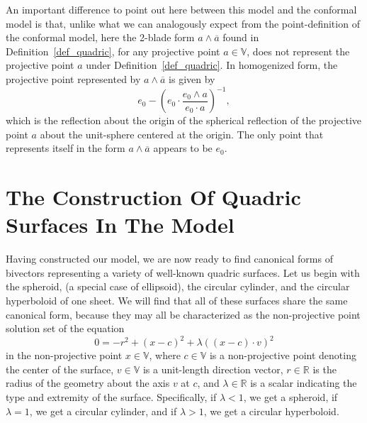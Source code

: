 \documentclass{ecgd-l}
\newcommand{\V}{\mathbb{V}}
\newcommand{\R}{\mathbb{R}}
\theoremstyle{definition}
\theoremstyle{remark}
\numberwithin{equation}{section}
\begin{document}
An important difference to point out here between this model and the conformal model is that,
unlike what we can analogously expect from the point-definition of the conformal model,
here the 2-blade form $a\wedge\overline{a}$ found in Definition~\ref{def_quadric}, for
any projective point $a\in\V$, does not represent the projective point $a$ under Definition~\ref{def_quadric}.
In homogenized form, the projective point represented by $a\wedge\overline{a}$ is given by
\begin{equation}
e_0 - \left(e_0\cdot\frac{e_0\wedge a}{e_0\cdot a}\right)^{-1},
\end{equation}
which is the reflection about the origin of the spherical reflection of the projective point $a$
about the unit-sphere centered at the origin.  The only point that represents itself
in the form $a\wedge\overline{a}$ appears to be $e_0$.

\section{The Construction Of Quadric Surfaces In The Model}

Having constructed our model, we are now ready to find canonical forms of bivectors
representing a variety of well-known quadric surfaces.  Let us begin with the
spheroid, (a special case of ellipsoid), the circular cylinder, and the circular hyperboloid
of one sheet.  We will find that all of these surfaces share the same canonical form,
because they may all be characterized as the non-projective point solution set of the equation
\begin{equation}\label{equ_spheroid}
0 = -r^2 + (x-c)^2 + \lambda((x-c)\cdot v)^2
\end{equation}
in the non-projective point $x\in\V$, where $c\in\V$ is a non-projective
point denoting the center of the surface, $v\in\V$ is a unit-length direction
vector, $r\in\R$ is the radius of the geometry about the axis $v$ at $c$, and
$\lambda\in\R$ is a scalar indicating the type and extremity of the surface.
Specifically, if $\lambda<1$, we get a spheroid, if $\lambda=1$, we get
a circular cylinder, and if $\lambda>1$, we get a circular  hyperboloid.
\end{document}
